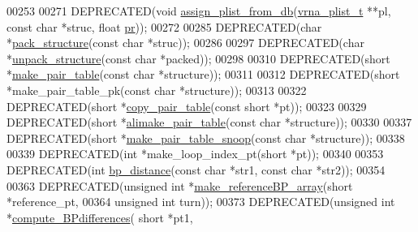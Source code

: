 \begin{DoxyCode}
00253 
00271 DEPRECATED(\textcolor{keywordtype}{void} \hyperlink{group__struct__utils_ga6f3031d77de925a7b4ca72e1d52dec2f}{assign\_plist\_from\_db}(\hyperlink{group__data__structures_structvrna__plist__s}{vrna\_plist\_t} **pl, \textcolor{keyword}{const} \textcolor{keywordtype}{char} *struc, \textcolor{keywordtype}{
      float} \hyperlink{fold__vars_8h_ac98ec419070aee6831b44e5c700f090f}{pr}));
00272 
00285 DEPRECATED(\textcolor{keywordtype}{char} *\hyperlink{group__struct__utils_gac6dfa5e22928c087c6e09ff0054a7ced}{pack\_structure}(\textcolor{keyword}{const} \textcolor{keywordtype}{char} *struc));
00286 
00297 DEPRECATED(\textcolor{keywordtype}{char} *\hyperlink{group__struct__utils_ga071c6921efe1eb974f115ee6fefa3c39}{unpack\_structure}(\textcolor{keyword}{const} \textcolor{keywordtype}{char} *packed));
00298 
00310 DEPRECATED(\textcolor{keywordtype}{short} *\hyperlink{group__struct__utils_ga89c32307ee50a0026f4a3131fac0845a}{make\_pair\_table}(\textcolor{keyword}{const} \textcolor{keywordtype}{char} *structure));
00311 
00312 DEPRECATED(\textcolor{keywordtype}{short} *make\_pair\_table\_pk(\textcolor{keyword}{const} \textcolor{keywordtype}{char} *structure));
00313 
00322 DEPRECATED(\textcolor{keywordtype}{short} *\hyperlink{group__struct__utils_gafeaa6d68eef3a99d0a7aa08aa91c6601}{copy\_pair\_table}(\textcolor{keyword}{const} \textcolor{keywordtype}{short} *pt));
00323 
00329 DEPRECATED(\textcolor{keywordtype}{short} *\hyperlink{group__struct__utils_ga3c81b3967056c3888b8472b65fbb16f5}{alimake\_pair\_table}(\textcolor{keyword}{const} \textcolor{keywordtype}{char} *structure));
00330 
00337 DEPRECATED(\textcolor{keywordtype}{short} *\hyperlink{group__struct__utils_ga9aa3bf3b4346bb7fb88efc154dd07a79}{make\_pair\_table\_snoop}(\textcolor{keyword}{const} \textcolor{keywordtype}{char} *structure));
00338 
00339 DEPRECATED(\textcolor{keywordtype}{int} *make\_loop\_index\_pt(\textcolor{keywordtype}{short} *pt));
00340 
00353 DEPRECATED(\textcolor{keywordtype}{int} \hyperlink{group__struct__utils_ga6ebbcd29a754f0e4f1a66d1fd84184db}{bp\_distance}(\textcolor{keyword}{const} \textcolor{keywordtype}{char} *str1, \textcolor{keyword}{const} \textcolor{keywordtype}{char} *str2));
00354 
00363 DEPRECATED(\textcolor{keywordtype}{unsigned} \textcolor{keywordtype}{int}  *\hyperlink{group__struct__utils_ga578cd9712dee812fb1c58aa3cc489864}{make\_referenceBP\_array}(\textcolor{keywordtype}{short} *reference\_pt,
00364                                       \textcolor{keywordtype}{unsigned} \textcolor{keywordtype}{int} turn));
00373 DEPRECATED(\textcolor{keywordtype}{unsigned} \textcolor{keywordtype}{int}  *\hyperlink{group__struct__utils_gadd463184355d0803b6ee6e09f29182f2}{compute\_BPdifferences}( \textcolor{keywordtype}{short} *pt1,

\end{DoxyCode}
